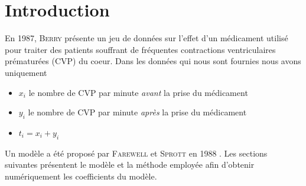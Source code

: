 \section{Introduction}
En 1987, \textsc{Berry} présente un jeu de données \cite{Berry1987} sur l'effet d'un médicament utilisé pour traiter des patients souffrant de fréquentes contractions ventriculaires prématurées (CVP) du coeur.
Dans les données qui nous sont fournies nous avons uniquement
\begin{itemize}
    \item $x_i$ le nombre de CVP par minute \textit{avant} la prise du médicament
    \item $y_i$ le nombre de CVP par minute \textit{après} la prise du médicament
    \item $t_i = x_i + y _i$
\end{itemize}

Un modèle a été proposé par \textsc{Farewell} et \textsc{Sprott} en 1988 \cite{Farewell1988}.
Les sections suivantes présentent le modèle et la méthode employée afin d'obtenir numériquement les coefficients du modèle.